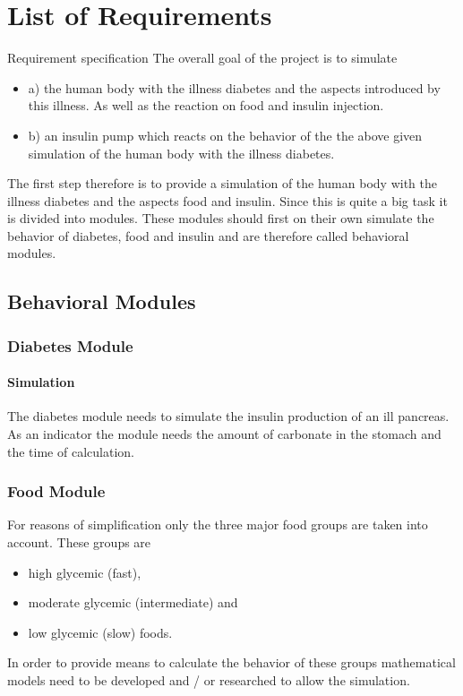 \section{List of Requirements}
Requirement specification 
The overall goal of the project is to simulate
\begin{itemize}
  \item a) the human body with the illness diabetes and the aspects introduced
  by this illness. As well as the reaction on food and insulin injection.
  \item b) an insulin pump which reacts on the behavior of the the above given
  simulation of the human body with the illness diabetes.
\end{itemize}
The first step therefore is to provide a simulation of the human body with the
illness diabetes and the aspects food and insulin. 
Since this is quite a big task it is divided into modules. These modules should
first on their own simulate the behavior of diabetes, food and insulin and are
therefore called behavioral modules.

\subsection{Behavioral Modules}

\subsubsection{Diabetes Module}
\paragraph{Simulation}
The diabetes module needs to simulate the insulin production of an ill pancreas. 
As an indicator the module needs the amount of carbonate in the stomach and the time of calculation.

\subsubsection{Food Module}
For reasons of simplification only the three major food groups are taken into
account.
These groups are 
\begin{itemize}
  \item high glycemic (fast),
  \item moderate glycemic (intermediate) and
  \item low glycemic (slow) foods.
\end{itemize}
In order to provide means to calculate the behavior of these groups
mathematical models need to be developed and / or researched to allow the
simulation.


